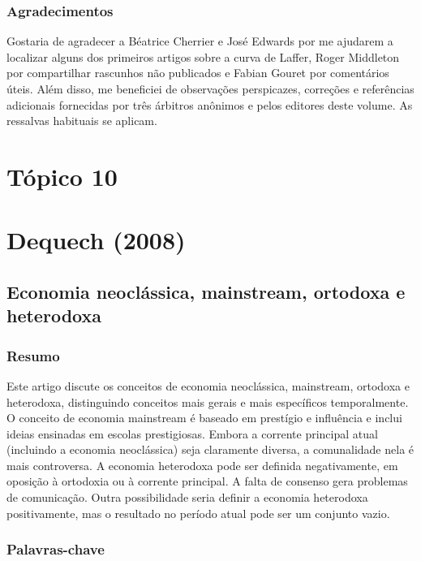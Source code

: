 \documentclass[12pt]{article}
\begin{document}
\subsubsection{\textbf{Agradecimentos}}

Gostaria de agradecer a Béatrice Cherrier e José Edwards por me ajudarem a localizar alguns dos primeiros artigos sobre a curva de Laffer, Roger Middleton por compartilhar rascunhos não publicados e Fabian Gouret por comentários úteis. Além disso, me beneficiei de observações perspicazes, correções e referências adicionais fornecidas por três árbitros anônimos e pelos editores deste volume. As ressalvas habituais se aplicam.

\newpage
\section*{\textbf{Tópico 10}}
\section{\textbf{Dequech (2008)}}
\subsection{\textbf{Economia neoclássica, mainstream, ortodoxa e heterodoxa}}

\subsubsection{\textbf{Resumo}}
Este artigo discute os conceitos de economia neoclássica, mainstream, ortodoxa e heterodoxa, distinguindo conceitos mais gerais e mais específicos temporalmente. O conceito de economia mainstream é baseado em prestígio e influência e inclui ideias ensinadas em escolas prestigiosas. Embora a corrente principal atual (incluindo a economia neoclássica) seja claramente diversa, a comunalidade nela é mais controversa. A economia heterodoxa pode ser definida negativamente, em oposição à ortodoxia ou à corrente principal. A falta de consenso gera problemas de comunicação. Outra possibilidade seria definir a economia heterodoxa positivamente, mas o resultado no período atual pode ser um conjunto vazio.

\subsubsection{\textbf{Palavras-chave}}
\end{document}
